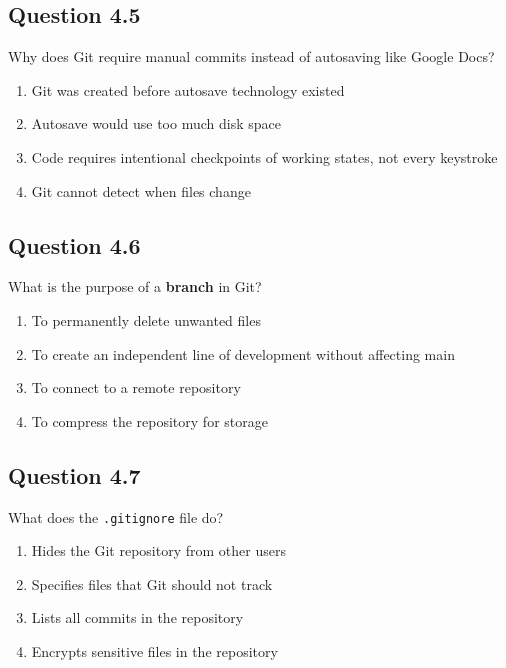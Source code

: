 \documentclass[
  letterpaper,
  DIV=11,
  numbers=noendperiod]{scrreprt}
\providecommand{\tightlist}{%
  \setlength{\itemsep}{0pt}\setlength{\parskip}{0pt}}
\begin{document}
\subsection{Question 4.5}\label{question-4.5}

Why does Git require manual commits instead of autosaving like Google
Docs?

\begin{enumerate}
\def\labelenumi{\Alph{enumi})}
\tightlist
\item
  Git was created before autosave technology existed\\
\item
  Autosave would use too much disk space\\
\item
  Code requires intentional checkpoints of working states, not every
  keystroke\\
\item
  Git cannot detect when files change
\end{enumerate}

\subsection{Question 4.6}\label{question-4.6}

What is the purpose of a \textbf{branch} in Git?

\begin{enumerate}
\def\labelenumi{\Alph{enumi})}
\tightlist
\item
  To permanently delete unwanted files\\
\item
  To create an independent line of development without affecting main\\
\item
  To connect to a remote repository\\
\item
  To compress the repository for storage
\end{enumerate}

\subsection{Question 4.7}\label{question-4.7}

What does the \texttt{.gitignore} file do?

\begin{enumerate}
\def\labelenumi{\Alph{enumi})}
\tightlist
\item
  Hides the Git repository from other users\\
\item
  Specifies files that Git should not track\\
\item
  Lists all commits in the repository\\
\item
  Encrypts sensitive files in the repository
\end{enumerate}
\end{document}
